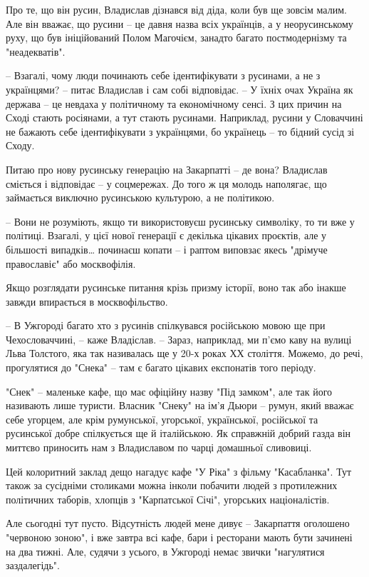 Про те, що він русин, Владислав дізнався від діда, коли був ще зовсім малим.
Але він вважає, що русини – це давня назва всіх українців, а у неорусинському
руху, що був ініційований Полом Магочієм, занадто багато постмодернізму та
"неадекватів".

– Взагалі, чому люди починають себе ідентифікувати з русинами, а не з
українцями? – питає Владислав і сам собі відповідає. – У їхніх очах Україна як
держава – це невдаха у політичному та економічному сенсі. З цих причин на Сході
стають росіянами, а тут стають русинами. Наприклад, русини у Словаччині не
бажають себе ідентифікувати з українцями, бо українець – то бідний сусід зі
Сходу.

Питаю про нову русинську генерацію на Закарпатті – де вона? Владислав сміється
і відповідає – у соцмережах. До того ж ця молодь наполягає, що займається
виключно русинською культурою, а не політикою.

– Вони не розуміють, якщо ти використовуєш русинську символіку, то ти вже у
політиці. Взагалі, у цієї нової генерації є декілька цікавих проєктів, але у
більшості випадків… починаєш копати – і раптом виповзає якесь "дрімуче
православіє" або москвофілія.

Якщо розглядати русинське питання крізь призму історії, воно так або інакше
завжди впирається в москвофільство.

– В Ужгороді багато хто з русинів спілкувався російською мовою ще при
Чехословаччині, – каже Владіслав. – Зараз, наприклад, ми п’ємо каву на вулиці
Льва Толстого, яка так називалась ще у 20-х роках ХХ століття. Можемо, до речі,
прогулятися до "Снека" – там є багато цікавих експонатів того періоду.

"Снек" – маленьке кафе, що має офіційну назву "Під замком", але так його
називають лише туристи. Власник "Снеку" на ім’я Дьюри – румун, який вважає себе
угорцем, але крім румунської, угорської, української, російської та русинської
добре спілкується ще й італійською. Як справжній добрий газда він миттєво
приносить нам з Владиславом по чарці домашньої сливовиці.

Цей колоритний заклад дещо нагадує кафе "У Ріка" з фільму "Касабланка". Тут
також за сусідніми столиками можна інколи побачити людей з протилежних
політичних таборів, хлопців з "Карпатської Січі", угорських націоналістів.

Але сьогодні тут пусто. Відсутність людей мене дивує – Закарпаття оголошено
"червоною зоною", і вже завтра всі кафе, бари і ресторани мають бути зачинені
на два тижні. Але, судячи з усього, в Ужгороді немає звички "нагулятися
заздалегідь".

